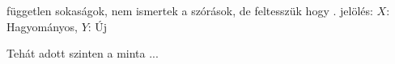 független sokaságok, nem ismertek a szórások, de feltesszük hogy
. jelölés: $X:$ Hagyományos, $Y$: Új

Tehát adott szinten a minta ...
